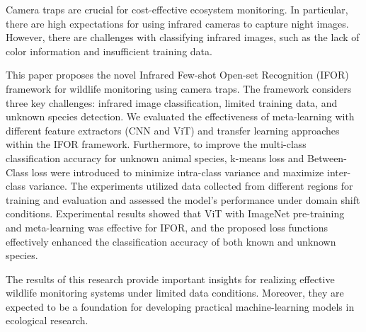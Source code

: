 
Camera traps are crucial for cost-effective ecosystem monitoring.
In particular, there are high expectations for using infrared cameras to capture night images.
However, there are challenges with classifying infrared images, such as the lack of color information and insufficient training data.

This paper proposes the novel Infrared Few-shot Open-set Recognition (IFOR) framework for wildlife monitoring using camera traps.
The framework considers three key challenges: infrared image classification, limited training data, and unknown species detection.
We evaluated the effectiveness of meta-learning with different feature extractors (CNN and ViT) and transfer learning approaches within the IFOR framework.
Furthermore, to improve the multi-class classification accuracy for unknown animal species, 
k-means loss and Between-Class loss were introduced to minimize intra-class variance and maximize inter-class variance.
The experiments utilized data collected from different regions for training and evaluation and assessed the model's performance under domain shift conditions.
Experimental results showed that ViT with ImageNet pre-training and meta-learning was effective for IFOR, 
and the proposed loss functions effectively enhanced the classification accuracy of both known and unknown species.

The results of this research provide important insights for realizing effective wildlife monitoring systems under limited data conditions.
Moreover, they are expected to be a foundation for developing practical machine-learning models in ecological research.